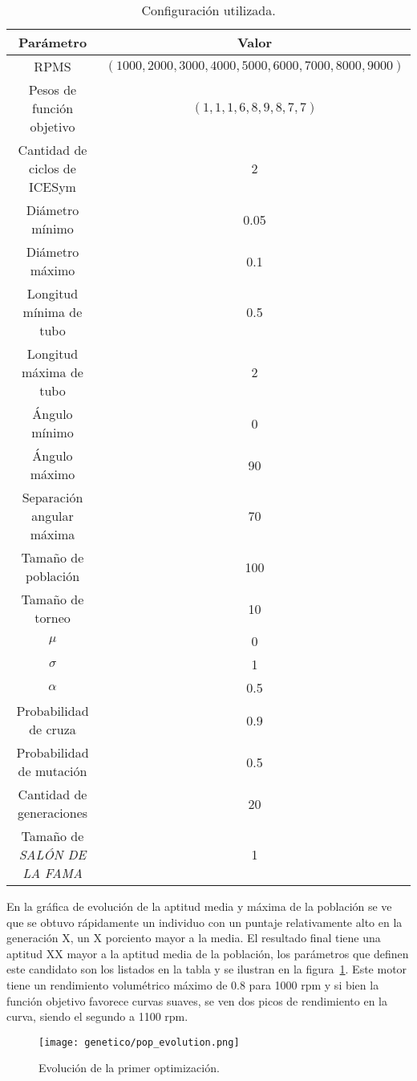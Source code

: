 \begin{table}
  \centering
  \begin{tabular}{cc} \toprule
    Parámetro & Valor \\ \midrule
    RPMS & $(1000, 2000, 3000, 4000, 5000, 6000, 7000, 8000, 9000)$ \\
    Pesos de función objetivo & $(1, 1, 1, 6, 8, 9, 8, 7, 7)$ \\
    Cantidad de ciclos de ICESym & 2 \\
    Diámetro mínimo & 0.05 \\
    Diámetro máximo & 0.1 \\
    Longitud mínima de tubo & 0.5 \\
    Longitud máxima de tubo & 2 \\
    Ángulo mínimo & 0 \\
    Ángulo máximo & 90 \\
    Separación angular máxima & 70 \\
    Tamaño de población & 100 \\
    Tamaño de torneo & 10 \\
    $\mu$ & 0 \\
    $\sigma$ & 1 \\
    $\alpha$ & 0.5 \\
    Probabilidad de cruza & 0.9 \\
    Probabilidad de mutación & 0.5 \\
    Cantidad de generaciones & 20 \\
    Tamaño de \emph{SALÓN DE LA FAMA} & 1 \\ \bottomrule
    \end{tabular}
  \caption{Configuración utilizada.}\label{tab:config_genetico}
\end{table}


En la gráfica de evolución de la aptitud media y máxima de la población se ve
que se obtuvo rápidamente un individuo con un puntaje relativamente alto en la
generación X, un X porciento mayor a la media.
%
El resultado final tiene una aptitud XX mayor a la aptitud media de la
población, los parámetros que definen este candidato son los listados en la
tabla y se ilustran en la figura~\ref{fig:pop_ev_1}.
%
Este motor tiene un rendimiento volumétrico máximo de 0.8 para 1000 rpm y si
bien la función objetivo favorece curvas suaves, se ven dos picos de rendimiento
en la curva, siendo el segundo a 1100 rpm.

\begin{figure}
    \centering
    \texttt{[image: genetico/pop\_evolution.png]}
    \caption{Evolución de la primer optimización.}\label{fig:pop_ev_1}
\end{figure}

